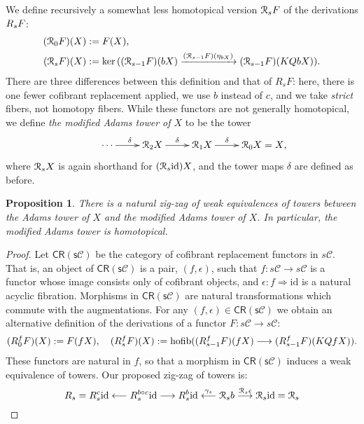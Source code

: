 \documentclass[11pt]{amsart} \renewcommand{\baselinestretch}{1.2}
\theoremstyle{plain}
\newtheorem{prop}[thm]{Proposition}
\numberwithin{equation}{section} %
\theoremstyle{plain}
\newtheorem{prop}[thm]{Proposition}
\numberwithin{equation}{chapter} %
\renewcommand{\ker}{\mathrm{ker}\,}
\DeclareMathOperator*{\hofib}{hofib}
\renewcommand{\to}{\longrightarrow}
\newcommand{\from}{\longleftarrow}
\newcommand{\calR}{\mathcal{R}}
\newcommand{\calc}{\mathcal{C}}
\newcommand{\Id}{\mathrm{id}}
\newcommand{\algcat}{{\calc}}%
\newcommand{\dupdown}[2]{R_{\smash{#1}}}
\newcommand{\caldup}[1]{\calR_{\smash{#1}}}
\newcommand{\plainD}{R}
\newcommand{\barConstructionMightAbbreviate}{b}
\begin{document}
\begin{Bousfield-Kan spectral sequence}
We define recursively a somewhat less homotopical version $\caldup{s}F$ of the derivations $\dupdown{s}{}F$:
\begin{alignat*}{2}
(\caldup{0}F)(X)
&:=
F(X),%
\\
(\caldup{s}F)(X)
&:=
\ker((\caldup{s-1}F)(\barConstructionMightAbbreviate X)\xrightarrow{(\caldup{s-1}F)(\eta_{\barConstructionMightAbbreviate X})} (\caldup{s-1}F)(KQ\barConstructionMightAbbreviate X)).
\end{alignat*}
There are three differences between this definition and that of $\plainD_sF$: here, there is one fewer cofibrant replacement applied, we use $\barConstructionMightAbbreviate $ instead of  $c$, and we take \emph{strict} fibers, not homotopy fibers.
While these functors are not generally homotopical, we define \emph{the modified Adams tower of $X$} to be the tower
\[\xymatrix@R=4mm{
\cdots 
\ar[r]^{\delta}
&%
\caldup{2}X
\ar[r]^{\delta}
&%
\caldup{1}X
\ar[r]^{\delta}&%
\caldup{0}X\makebox[0cm][l]{${}=X$,}
}\]
where $\caldup{s}X$ is again shorthand for $(\caldup{s}\Id )X$, and the tower maps $\delta$ are defined as before.
\begin{prop}
\label{prop:modifiedAdamsTower}
There is a natural zig-zag of weak equivalences of towers between the Adams tower of $X$ and the modified Adams tower of $X$. In particular, the modified Adams tower is homotopical.
\end{prop}
\begin{proof}
Let $\mathsf{CR(s\algcat)}$ be the category of cofibrant replacement functors in $s\algcat$. That is, an object of $\mathsf{CR(s\algcat)}$ is a pair, $(f,\epsilon)$, such that $f:s\algcat\to s\algcat$ is a functor whose image consists only of cofibrant objects, and $\epsilon:f\Rightarrow \Id $ is a natural acyclic fibration. Morphisms in $\mathsf{CR(s\algcat)}$ are natural transformations which commute with the augmentations. For any $(f,\epsilon)\in\mathsf{CR(s\algcat)}$ we obtain an alternative definition of the derivations of a functor $F:s\algcat\to s\algcat$:
\begin{alignat*}{2}
(\plainD_{\smash{0}}^{\smash{f}}F)(X)
:=
F(fX),\quad %
(\plainD_{\smash{s}}^{\smash{f}}F)(X)
:=
\hofib((\plainD_{\smash{s-1}}^{\smash{f}}F)(fX)\to (\plainD_{\smash{s-1}}^{\smash{f}}F)(KQfX)).
\end{alignat*}
These functors are natural in $f$, so that a morphism in $\mathsf{CR(s\algcat)}$ induces a weak equivalence of towers. Our proposed zig-zag of towers is: 
\[\plainD_{\smash{s}}= \plainD_{\smash{s}}^{\smash{c}}\Id \overset{}{\from}\plainD_{\smash{s}}^{\smash{\barConstructionMightAbbreviate \circ c}}\Id \overset{}{\to}\plainD_{\smash{s}}^{\smash{\barConstructionMightAbbreviate }}\Id \overset{\gamma_s}{\from}\caldup{s}\barConstructionMightAbbreviate \overset{\caldup{s}\epsilon}{\to}\caldup{s}\Id =\caldup{s}\]

\end{proof}
\end{Bousfield-Kan spectral sequence}
\end{document}
